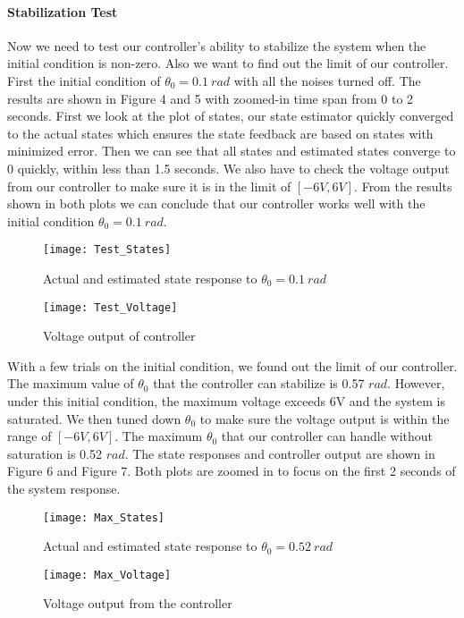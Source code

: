 \documentclass{article}
\begin{document}
\paragraph{Stabilization Test}
Now we need to test our controller's ability to stabilize the system when the initial condition is non-zero. Also we want to find out the limit of our controller. First the initial condition of $\theta_0=0.1\ rad$ with all the noises turned off. The results are shown in Figure 4 and 5 with zoomed-in time span from 0 to 2 seconds. First we look at the plot of states, our state estimator quickly converged to the actual states which ensures the state feedback are based on states with minimized error. Then we can see that all states and estimated states converge to 0 quickly, within less than 1.5 seconds. We also have to check the voltage output from our controller to make sure it is in the limit of $[-6V,6V]$. From the results shown in both plots we can conclude that our controller works well with the initial condition $\theta_0=0.1\ rad$.\par
\begin{figure}[h!]
\texttt{[image: Test\_States]}
\centering
\caption{Actual and estimated state response to $\theta_0=0.1\ rad$}
\end{figure}
\begin{figure}[h!]
\texttt{[image: Test\_Voltage]}
\centering
\caption{Voltage output of controller}
\end{figure}
With a few trials on the initial condition, we found out the limit of our controller. The maximum value of $\theta_0$ that the controller can stabilize is 0.57 $rad$. However, under this initial condition, the maximum voltage exceeds 6V and the system is saturated. We then tuned down $\theta_0$ to make sure the voltage output is within the range of $[-6V,6V]$. The maximum $\theta_0$ that our controller can handle without saturation is 0.52 $rad$. The state responses and controller output are shown in Figure 6 and Figure 7. Both plots are zoomed in to focus on the first 2 seconds of the system response.\par   
\begin{figure}[h!]
\texttt{[image: Max\_States]}
\centering
\caption{Actual and estimated state response to $\theta_0=0.52\ rad$}
\end{figure}
\begin{figure}[h!]
\texttt{[image: Max\_Voltage]}
\centering
\caption{Voltage output from the controller}
\end{figure}
\end{document}
